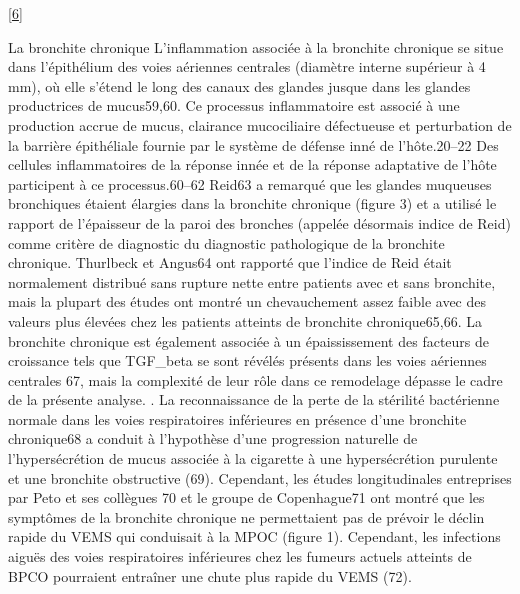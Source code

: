 \documentclass[12pt,]{article}
\begin{document}
{[}\protect\hyperlink{ref-hogg2004pathophysiology}{6}{]}

La bronchite chronique L'inflammation associée à la bronchite chronique
se situe dans l'épithélium des voies aériennes centrales (diamètre
interne supérieur à 4 mm), où elle s'étend le long des canaux des
glandes jusque dans les glandes productrices de mucus59,60. Ce processus
inflammatoire est associé à une production accrue de mucus, clairance
mucociliaire défectueuse et perturbation de la barrière épithéliale
fournie par le système de défense inné de l'hôte.20--22 Des cellules
inflammatoires de la réponse innée et de la réponse adaptative de l'hôte
participent à ce processus.60--62 Reid63 a remarqué que les glandes
muqueuses bronchiques étaient élargies dans la bronchite chronique
(figure 3) et a utilisé le rapport de l'épaisseur de la paroi des
bronches (appelée désormais indice de Reid) comme critère de diagnostic
du diagnostic pathologique de la bronchite chronique. Thurlbeck et
Angus64 ont rapporté que l'indice de Reid était normalement distribué
sans rupture nette entre patients avec et sans bronchite, mais la
plupart des études ont montré un chevauchement assez faible avec des
valeurs plus élevées chez les patients atteints de bronchite
chronique65,66. La bronchite chronique est également associée à un
épaississement des facteurs de croissance tels que TGF\_beta se sont
révélés présents dans les voies aériennes centrales 67, mais la
complexité de leur rôle dans ce remodelage dépasse le cadre de la
présente analyse. . La reconnaissance de la perte de la stérilité
bactérienne normale dans les voies respiratoires inférieures en présence
d'une bronchite chronique68 a conduit à l'hypothèse d'une progression
naturelle de l'hypersécrétion de mucus associée à la cigarette à une
hypersécrétion purulente et une bronchite obstructive (69). Cependant,
les études longitudinales entreprises par Peto et ses collègues 70 et le
groupe de Copenhague71 ont montré que les symptômes de la bronchite
chronique ne permettaient pas de prévoir le déclin rapide du VEMS qui
conduisait à la MPOC (figure 1). Cependant, les infections aiguës des
voies respiratoires inférieures chez les fumeurs actuels atteints de
BPCO pourraient entraîner une chute plus rapide du VEMS (72).
\end{document}
